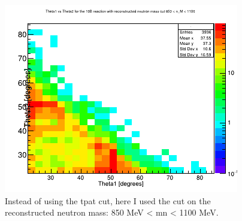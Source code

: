 \documentclass{report}
\begin{document}
\begin{figure}[hbt!]
  \includegraphics[width=\linewidth]{theta1_vs_theta2_m_cut.png}
  \caption{Instead of using the tpat cut, here I used the cut on the reconstructed neutron mass: 850 MeV < m\textunderscore n < 1100 MeV.}
  \label{fig:theta1_vs_theta2_m_cut}
\end{figure}
\newpage
\end{document}
